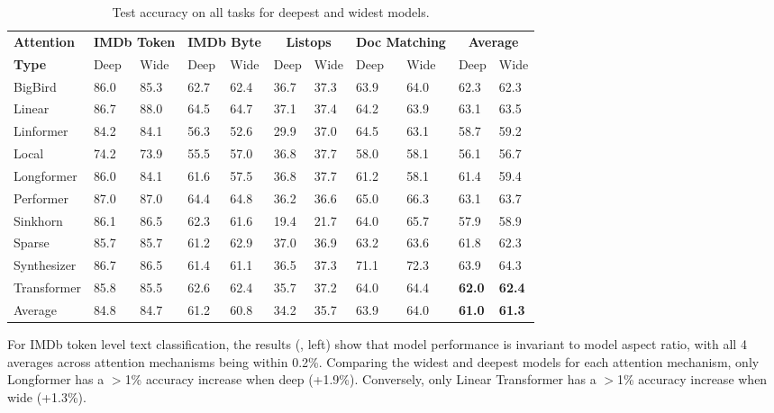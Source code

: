 \begin{table}[!t]
    \caption{Test accuracy on all tasks for deepest and widest models.}
    \label{table:summary}
    \begin{center}
        \begin{tabular}{l | l l l l l l l l | l l}
            \toprule
            {\bf Attention} & \multicolumn{2}{c}{\bf IMDb Token} & \multicolumn{2}{c}{\bf IMDb Byte} & \multicolumn{2}{c}{\bf Listops} & \multicolumn{2}{c}{\bf Doc Matching} & \multicolumn{2}{c}{\bf Average} \\
            {\bf Type} & Deep & Wide & Deep & Wide & Deep & Wide & Deep & Wide & Deep & Wide \\
            \midrule
BigBird & 86.0 & 85.3 & 62.7 & 62.4 & 36.7 & 37.3 & 63.9 & 64.0 & 62.3 & 62.3 \\
Linear & 86.7 & 88.0 & 64.5 & 64.7 & 37.1 & 37.4 & 64.2 & 63.9 & 63.1 & 63.5 \\
Linformer & 84.2 & 84.1 & 56.3 & 52.6 & 29.9 & 37.0 & 64.5 & 63.1 & 58.7 & 59.2 \\
Local & 74.2 & 73.9 & 55.5 & 57.0 & 36.8 & 37.7 & 58.0 & 58.1 & 56.1 & 56.7 \\
Longformer & 86.0 & 84.1 & 61.6 & 57.5 & 36.8 & 37.7 & 61.2 & 58.1 & 61.4 & 59.4 \\
Performer & 87.0 & 87.0 & 64.4 & 64.8 & 36.2 & 36.6 & 65.0 & 66.3 & 63.1 & 63.7 \\
Sinkhorn & 86.1 & 86.5 & 62.3 & 61.6 & 19.4 & 21.7 & 64.0 & 65.7 & 57.9 & 58.9 \\
Sparse & 85.7 & 85.7 & 61.2 & 62.9 & 37.0 & 36.9 & 63.2 & 63.6 & 61.8 & 62.3 \\
Synthesizer & 86.7 & 86.5 & 61.4 & 61.1 & 36.5 & 37.3 & 71.1 & 72.3 & 63.9 & 64.3 \\
Transformer & 85.8 & 85.5 & 62.6 & 62.4 & 35.7 & 37.2 & 64.0 & 64.4 & \textbf{62.0} & \textbf{62.4}  \\
\bottomrule
Average & 84.8 & 84.7 & 61.2 & 60.8 & 34.2 & 35.7 & 63.9 & 64.0 & \textbf{61.0} & \textbf{61.3} \\
        \end{tabular}
    \end{center}
\end{table}



For IMDb token level text classification, the results (, left) show that model performance is invariant to model aspect ratio, with all 4 averages across attention mechanisms being within 0.2\%.
Comparing the widest and deepest models for each attention mechanism, only Longformer has a $>$1\% accuracy increase when deep (+1.9\%).
Conversely, only Linear Transformer has a $>$1\% accuracy increase when wide (+1.3\%).

